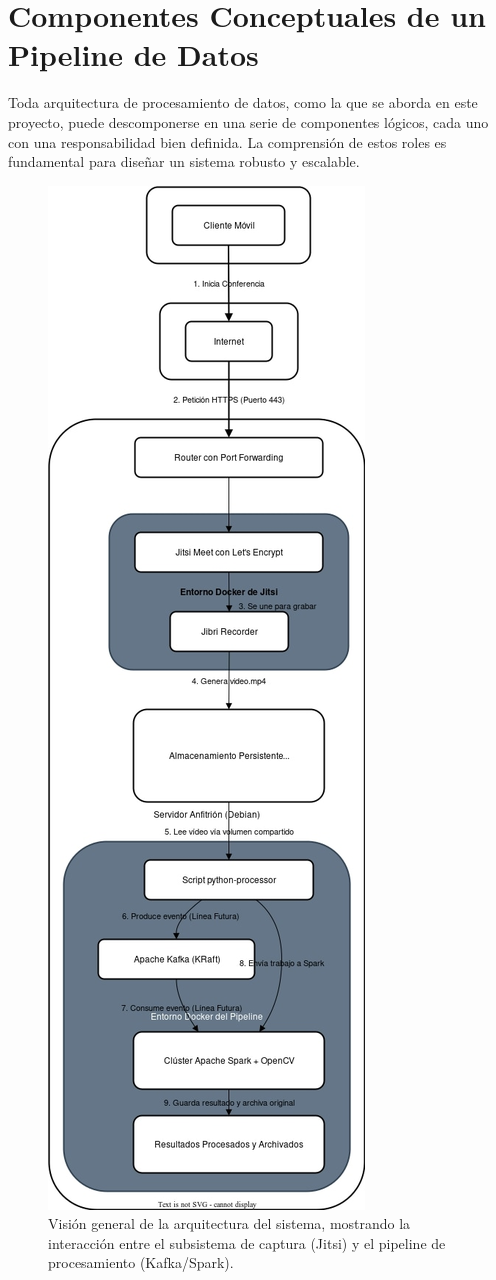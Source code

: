\section{Componentes Conceptuales de un Pipeline de Datos}
\label{sec:conceptos_pipeline}
Toda arquitectura de procesamiento de datos, como la que se aborda en este proyecto, puede descomponerse en una serie de componentes lógicos, cada uno con una responsabilidad bien definida. La comprensión de estos roles es fundamental para diseñar un sistema robusto y escalable.
\begin{figure}[H]
    \centering
    \includegraphics[height=0.9\textheight]{img/arquitectura-general.jpg}
    \caption{Visión general de la arquitectura del sistema, mostrando la interacción entre el subsistema de captura (Jitsi) y el pipeline de procesamiento (Kafka/Spark).}
    \label{fig:arquitectura_completa}
\end{figure}

